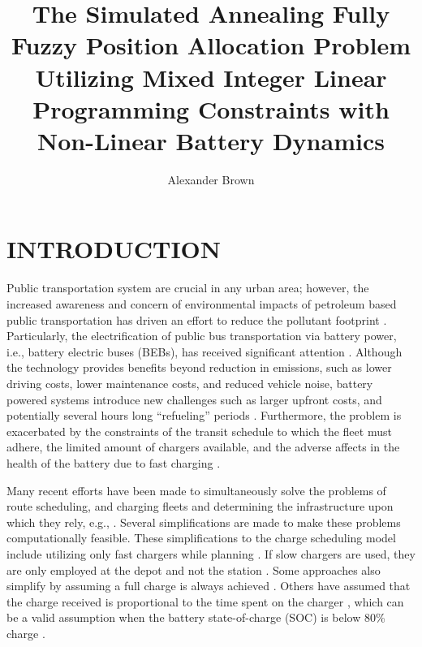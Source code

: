 \documentclass[ee,msthesis]{usuthesis}
\author{Alexander Brown}
\date{}
\title{The Simulated Annealing Fully Fuzzy Position Allocation Problem Utilizing Mixed Integer Linear Programming Constraints with Non-Linear Battery Dynamics}
\begin{document}
\maketitle
\let\ref\autoref                            %

\tableofcontents
\listoftables
\listoffigures

\let\ref\autoref                            %

\body  %

\chapter{INTRODUCTION}
\label{sec:introduction}
Public transportation system are crucial in any urban area; however, the increased awareness and concern of
environmental impacts of petroleum based public transportation has driven an effort to reduce the pollutant footprint
\cite{de-2014-simul-elect,xylia-2018-role-charg,guida-2017-zeeus-repor-europ,li-2016-batter-elect}. Particularly,
the electrification of public bus transportation via battery power, i.e., battery electric buses (BEBs), has received
significant attention \cite{li-2016-batter-elect}. Although the technology provides benefits beyond reduction in
emissions, such as lower driving costs, lower maintenance costs, and reduced vehicle noise, battery powered systems
introduce new challenges such as larger upfront costs, and potentially several hours long ``refueling'' periods
\cite{xylia-2018-role-charg,li-2016-batter-elect}. Furthermore, the problem is exacerbated by the constraints of the
transit schedule to which the fleet must adhere, the limited amount of chargers available, and the adverse affects in
the health of the battery due to fast charging \cite{lutsey-2019-updat-elect}.

Many recent efforts have been made to simultaneously solve the problems of route scheduling, and charging fleets and
determining the infrastructure upon which they rely, e.g., \cite{wei-2018-optim-spatio,sebastiani-2016-evaluat-elect,hoke-2014-accoun-lithium,wang-2017-elect-vehic}. Several simplifications are made to make these problems
computationally feasible. These simplifications to the charge scheduling model include utilizing only fast chargers
while planning \cite{wei-2018-optim-spatio,sebastiani-2016-evaluat-elect,wang-2017-optim-rechar,zhou-2020-bi-objec,yang-2018-charg-sched,wang-2017-elect-vehic,qin-2016-numer-analy,liu-2020-batter-elect}. If slow chargers are used,
they are only employed at the depot and not the station \cite{he-2020-optim-charg,tang-2019-robus-sched}. Some
approaches also simplify by assuming a full charge is always achieved
\cite{wei-2018-optim-spatio,wang-2017-elect-vehic,zhou-2020-bi-objec,wang-2017-optim-rechar}. Others have assumed
that the charge received is proportional to the time spent on the charger
\cite{liu-2020-batter-elect,yang-2018-charg-sched}, which can be a valid assumption when the battery state-of-charge
(SOC) is below 80\% charge \cite{liu-2020-batter-elect}.
\end{document}
